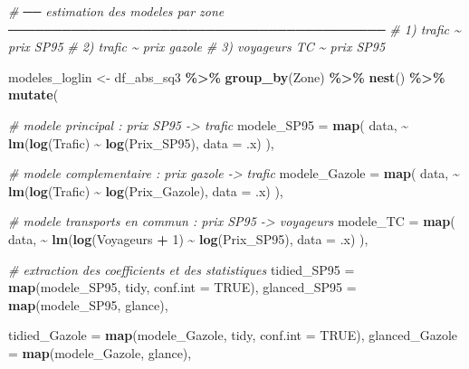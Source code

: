 \documentclass[
]{article}
\newenvironment{Shaded}{\begin{snugshade}}{\end{snugshade}}
\newcommand{\AttributeTok}[1]{\textcolor[rgb]{0.13,0.29,0.53}{#1}}
\newcommand{\CommentTok}[1]{\textcolor[rgb]{0.56,0.35,0.01}{\textit{#1}}}
\newcommand{\ConstantTok}[1]{\textcolor[rgb]{0.56,0.35,0.01}{#1}}
\newcommand{\DecValTok}[1]{\textcolor[rgb]{0.00,0.00,0.81}{#1}}
\newcommand{\FunctionTok}[1]{\textcolor[rgb]{0.13,0.29,0.53}{\textbf{#1}}}
\newcommand{\NormalTok}[1]{#1}
\newcommand{\OtherTok}[1]{\textcolor[rgb]{0.56,0.35,0.01}{#1}}
\newcommand{\SpecialCharTok}[1]{\textcolor[rgb]{0.81,0.36,0.00}{\textbf{#1}}}
\begin{document}
\begin{Shaded}
\begin{Highlighting}[]
\CommentTok{\# ── estimation des modeles par zone ──────────────────────────────────────────}
\CommentTok{\# 1) trafic \textasciitilde{} prix SP95}
\CommentTok{\# 2) trafic \textasciitilde{} prix gazole}
\CommentTok{\# 3) voyageurs TC \textasciitilde{} prix SP95}

\NormalTok{modeles\_loglin }\OtherTok{\textless{}{-}}\NormalTok{ df\_abs\_sq3 }\SpecialCharTok{\%\textgreater{}\%}
  \FunctionTok{group\_by}\NormalTok{(Zone) }\SpecialCharTok{\%\textgreater{}\%}
  \FunctionTok{nest}\NormalTok{() }\SpecialCharTok{\%\textgreater{}\%}
  \FunctionTok{mutate}\NormalTok{(}

    \CommentTok{\# modele principal : prix SP95 {-}\textgreater{} trafic}
    \AttributeTok{modele\_SP95 =} \FunctionTok{map}\NormalTok{(}
\NormalTok{      data,}
      \SpecialCharTok{\textasciitilde{}} \FunctionTok{lm}\NormalTok{(}\FunctionTok{log}\NormalTok{(Trafic) }\SpecialCharTok{\textasciitilde{}} \FunctionTok{log}\NormalTok{(Prix\_SP95), }\AttributeTok{data =}\NormalTok{ .x)}
\NormalTok{    ),}

    \CommentTok{\# modele complementaire : prix gazole {-}\textgreater{} trafic}
    \AttributeTok{modele\_Gazole =} \FunctionTok{map}\NormalTok{(}
\NormalTok{      data,}
      \SpecialCharTok{\textasciitilde{}} \FunctionTok{lm}\NormalTok{(}\FunctionTok{log}\NormalTok{(Trafic) }\SpecialCharTok{\textasciitilde{}} \FunctionTok{log}\NormalTok{(Prix\_Gazole), }\AttributeTok{data =}\NormalTok{ .x)}
\NormalTok{    ),}

    \CommentTok{\# modele transports en commun : prix SP95 {-}\textgreater{} voyageurs}
    \AttributeTok{modele\_TC =} \FunctionTok{map}\NormalTok{(}
\NormalTok{      data,}
      \SpecialCharTok{\textasciitilde{}} \FunctionTok{lm}\NormalTok{(}\FunctionTok{log}\NormalTok{(Voyageurs }\SpecialCharTok{+} \DecValTok{1}\NormalTok{) }\SpecialCharTok{\textasciitilde{}} \FunctionTok{log}\NormalTok{(Prix\_SP95), }\AttributeTok{data =}\NormalTok{ .x)}
\NormalTok{    ),}

    \CommentTok{\# extraction des coefficients et des statistiques}
    \AttributeTok{tidied\_SP95  =} \FunctionTok{map}\NormalTok{(modele\_SP95, tidy, }\AttributeTok{conf.int =} \ConstantTok{TRUE}\NormalTok{),}
    \AttributeTok{glanced\_SP95 =} \FunctionTok{map}\NormalTok{(modele\_SP95, glance),}

    \AttributeTok{tidied\_Gazole  =} \FunctionTok{map}\NormalTok{(modele\_Gazole, tidy, }\AttributeTok{conf.int =} \ConstantTok{TRUE}\NormalTok{),}
    \AttributeTok{glanced\_Gazole =} \FunctionTok{map}\NormalTok{(modele\_Gazole, glance),}


\end{Highlighting}
\end{Shaded}
\end{document}
